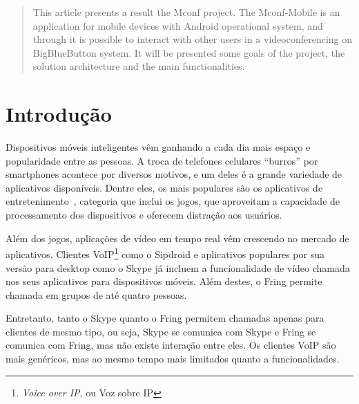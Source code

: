 \documentclass{acm_proc_article-sp}
\begin{document}
\begin{abstract}
  This article presents a result the Mconf project. The Mconf-Mobile is an application for mobile devices with Android operational system, and through it is possible to interact with other users in a videoconferencing on BigBlueButton system. It will be presented some goals of the project, the solution architecture and the main functionalities.
\end{abstract}






\section{Introdução}

Dispositivos móveis inteligentes vêm ganhando a cada dia mais espaço e popularidade entre as pessoas. A troca de telefones celulares ``burros'' por smartphones acontece por diversos motivos, e um deles é a grande variedade de aplicativos disponíveis. Dentre eles, os mais populares são os aplicativos de entretenimento~\cite{android-stats}, categoria que inclui os jogos, que aproveitam a capacidade de processamento dos dispositivos e oferecem distração aos usuários.

Além dos jogos, aplicações de vídeo em tempo real vêm crescendo no mercado de aplicativos. Clientes VoIP\footnote{\emph{Voice over IP}, ou Voz sobre IP} como o Sipdroid e aplicativos populares por sua versão para desktop como o Skype já incluem a funcionalidade de vídeo chamada nos seus aplicativos para dispositivos móveis. Além destes, o Fring permite chamada em grupos de até quatro pessoas.

Entretanto, tanto o Skype quanto o Fring permitem chamadas apenas para clientes de mesmo tipo, ou seja, Skype se comunica com Skype e Fring se comunica com Fring, mas não existe interação entre eles. Os clientes VoIP são mais genéricos, mas ao mesmo tempo mais limitados quanto a funcionalidades.
\end{document}
